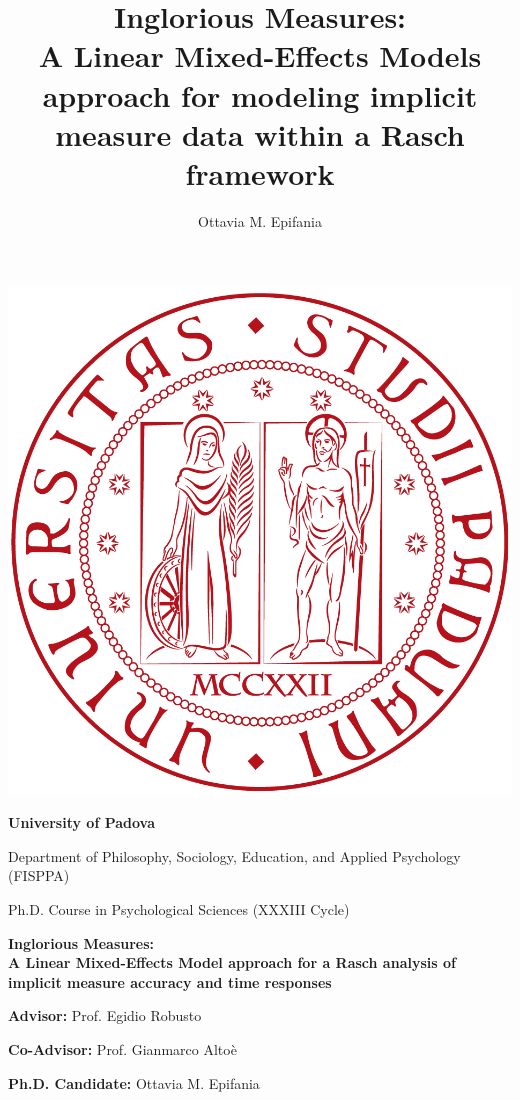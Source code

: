 \documentclass[12pt]{book}
\title{Inglorious Measures: \\ A Linear Mixed-Effects Models approach for modeling implicit measure data within a Rasch framework}
\author{Ottavia M. Epifania}
\begin{document}
	
	
	\frontmatter
	
	\thispagestyle{empty}
	
	\begin{center}
		\includegraphics[width=0.25\linewidth]{unipd.png}
	\end{center}
	
	\begin{center}
		\begin{Large}
			\textbf{University of Padova}
			
			Department of Philosophy, Sociology, Education, and Applied Psychology (FISPPA)
		\end{Large}
		
	\end{center}
	
	\vspace{3mm}
	\begin{center}
		\begin{large}
			Ph.D. Course in Psychological Sciences (XXXIII Cycle)
		\end{large}
		
		\begin{huge}
			\bfseries
			Inglorious Measures: \\ A Linear Mixed-Effects Model approach for a Rasch analysis of implicit measure accuracy and time responses
		\end{huge}
		
		
	\end{center}
	
	\vspace{2cm}
	\begin{multicols}{2}
		\begin{flushleft}
				\textbf{Advisor:} Prof. Egidio Robusto
				
				\textbf{Co-Advisor:} Prof. Gianmarco Altoè
			
		\end{flushleft}
		\columnbreak
		\begin{flushright}
			\vspace{1.5cm}
			
				\textbf{Ph.D. Candidate:} Ottavia M. Epifania 
			
		\end{flushright}
		
	\end{multicols}
\end{document}
